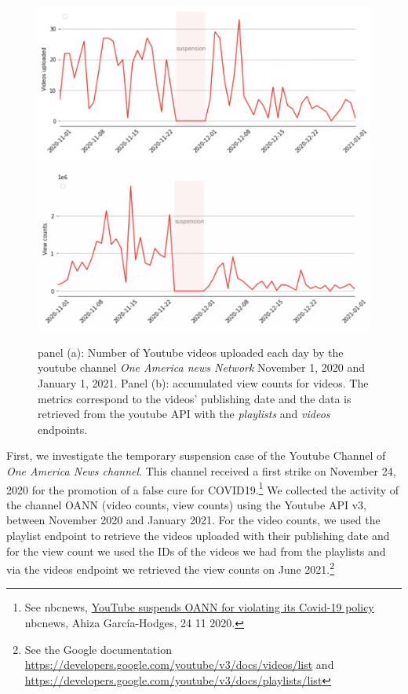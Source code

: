\documentclass{article}
\begin{document}
\begin{figure}
	\centering
		\includegraphics[scale=0.24]{./img/oann/fig1_oann.png}
		\includegraphics[scale=0.25]{./img/oann/fig2_oann.png} 
	\caption{panel (a): Number of Youtube videos uploaded each day by the youtube channel {\it One America news Network} November 1, 2020 and January 1, 2021. Panel (b): accumulated view counts for videos. The metrics correspond to the videos’  publishing date and the data is retrieved from the youtube API with the {\it playlists} and  {\it videos} endpoints. }
	\label{fig1_oann}
\end{figure}

First, we investigate the temporary suspension case of the Youtube Channel of {\it One America News channel}. This channel received a first strike on November 24, 2020 for the promotion of  a false cure for COVID19.\footnote{See nbcnews,  \href{https://www.nbcnews.com/news/all/youtube-suspends-oann-violating-its-covid-19-policy-n1248845}{YouTube suspends OANN for violating its Covid-19 policy} nbcnews, Ahiza García-Hodges, 24 11 2020.} We collected the activity of the channel OANN (video counts, view counts) using  the Youtube API v3, between November 2020 and January 2021. For the video counts, we used the playlist endpoint to retrieve the videos uploaded with their publishing date and for the view count we used the IDs of the videos we had from the playlists and via the videos endpoint we retrieved the view counts on June 2021.\footnote{See the Google documentation  \href{https://developers.google.com/youtube/v3/docs/videos/list}{https://developers.google.com/youtube/v3/docs/videos/list} and \href{https://developers.google.com/youtube/v3/docs/playlists/list}{https://developers.google.com/youtube/v3/docs/playlists/list}} 
\end{document}
